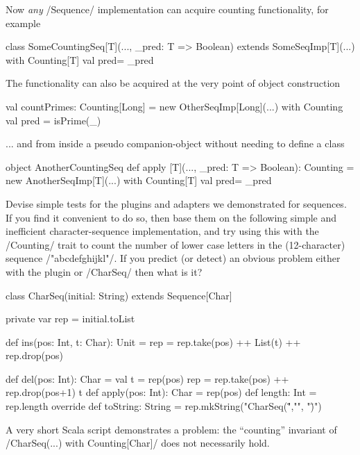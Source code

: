 \documentclass{ip3}
\begin{document}
\begin{foil}
\begin{itemize}
    \vitem Now \textit{any} \sc/Sequence/ implementation can acquire counting functionality, for example
    \begin{scala}
        class SomeCountingSeq[T](..., _pred: T => Boolean) 
              extends SomeSeqImp[T](...) 
              with    Counting[T] { val pred= _pred }
    \end{scala}

    \vitem The functionality can also be acquired at the very point of object construction        
    \begin{scala}
        val countPrimes: Counting[Long] = 
            new  OtherSeqImp[Long](...) with Counting  { val pred = isPrime(_) }
    \end{scala}
    
    \vitem ... and from inside a pseudo companion-object without needing to define 
           a class       
    \begin{-scala}
           object AnotherCountingSeq {
              def apply [T](..., _pred: T => Boolean): Counting =  
                  new     AnotherSeqImp[T](...) 
                  with    Counting[T] { val pred= _pred }
           }
    \end{-scala} 
\end{itemize}


\newexercisepage
\begin{exercise}
Devise simple tests for the plugins and adapters we demonstrated for sequences. 
If you find it convenient to do so, then base them on the following simple and inefficient
character-sequence implementation, and try using this with the \sc/Counting/ trait to
count the number of lower case letters in the (12-character) sequence 
\sc/"abcdefghijkl"/. If you predict (or detect) an obvious problem either with the plugin or
\sc/CharSeq/ then what is it?
\begin{--code}
    class CharSeq(initial: String) extends Sequence[Char] {
     private var rep = initial.toList
     
     def ins(pos: Int, t: Char): Unit = 
         { rep = rep.take(pos) ++ List(t) ++ rep.drop(pos) }
         
     def del(pos: Int): Char = {
         val t = rep(pos)
         rep = rep.take(pos) ++ rep.drop(pos+1)
         t
     } 
     def apply(pos: Int): Char = rep(pos)
     def length: Int           = rep.length
     override def toString: String = rep.mkString("CharSeq(\"","", "\")")
    } 
\end{--code}
\begin{answer}
A very short Scala script demonstrates a problem: the ``counting'' invariant
of  \sc/CharSeq(...) with Counting[Char]/ does not necessarily hold. 


\end{answer}
\end{exercise}
\end{foil}
\end{document}
